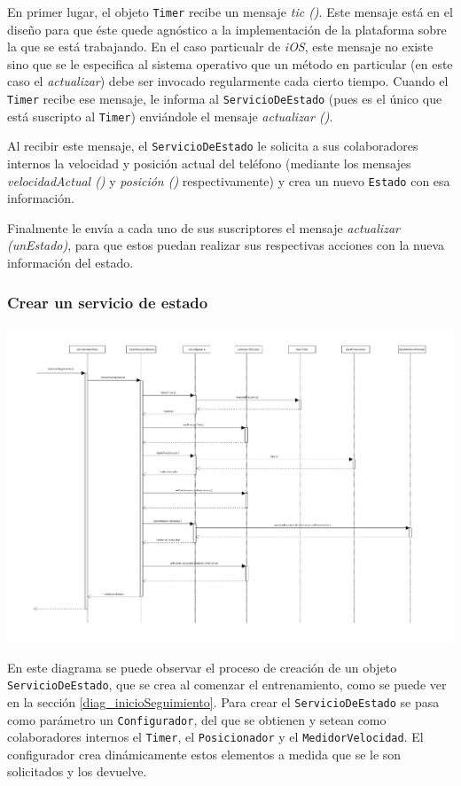 En primer lugar, el objeto \texttt{Timer} recibe un mensaje \emph{tic ()}. Este mensaje está en el diseño para que éste quede agnóstico a la implementación de la plataforma sobre la que se está trabajando. En el caso particualr de \emph{iOS}, este mensaje no existe sino que se le especifica al sistema operativo que un método en particular (en este caso el \emph{actualizar}) debe ser invocado regularmente cada cierto tiempo. Cuando el \texttt{Timer} recibe ese mensaje, le informa al \texttt{ServicioDeEstado} (pues es el único que está suscripto al \texttt{Timer}) enviándole el mensaje \emph{actualizar ()}.


Al recibir este mensaje, el \texttt{ServicioDeEstado} le solicita a sus colaboradores internos la velocidad y posición actual del teléfono (mediante los mensajes \emph{velocidadActual ()} y \emph{posición ()} respectivamente) y crea un nuevo \texttt{Estado} con esa información.


Finalmente le envía a cada uno de sus suscriptores el mensaje \emph{actualizar (unEstado)}, para que estos puedan realizar sus respectivas acciones con la nueva información del estado. 

\subsubsection{Crear un servicio de estado}\label{diag_crearUnServicioDeEstado}
\begin{center}
	\includegraphics[scale=0.5]{images/CrearServicioEstado.pdf}
\end{center}

En este diagrama se puede observar el proceso de creación de un objeto \texttt{ServicioDeEstado}, que se crea al comenzar el entrenamiento, como se puede ver en la sección \ref{diag_inicioSeguimiento}. Para crear el \texttt{ServicioDeEstado}
 se pasa como parámetro un \texttt{Configurador}, del que se obtienen y setean como colaboradores internos el \texttt{Timer}, el \texttt{Posicionador} y el \texttt{MedidorVelocidad}. El configurador crea dinámicamente estos elementos a medida que se le son solicitados y los devuelve.


